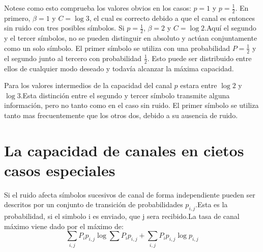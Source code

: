 Notese como esto comprueba los valores obvios en los casos: $p = 1$ y $p = \frac{1}{2}$. En primero, $\beta = 1$ y $C = \log{3}$, 
el cual es correcto debido a que el canal es entonces sin ruido con tres posibles s\'imbolos. Si $p = \frac{1}{2}$, $\beta = 2$ y 
$C = \log{2}$.Aqu\'i el segundo y el tercer s\'imbolos, no se pueden distinguir en absoluto y act\'uan conjuntamente como un solo 
s\'imbolo. El primer s\'imbolo se utiliza con una probabilidad $P = \frac{1}{2}$  y el segundo junto al tercero con probabilidad $\frac{1}{2}$.
Esto puede ser distribuido entre ellos de cualquier modo deseado y todav\'ia alcanzar la m\'axima capacidad.

Para los valores intermedios de la capacidad del canal $p$ estara entre $\log{2}$ y $\log{3}$.Esta distinci\'on 
entre el segundo y tercer s\'imbolo transmite alguna informaci\'on, pero no tanto como en el caso sin ruido.
El primer s\'imbolo se utiliza tanto mas frecuentemente que los otros dos, debido a su ausencia de ruido.

\clearpage

\chapter{La capacidad de canales en cietos casos especiales}
\label{sec:16}

Si el ruido afecta s\'imbolos sucesivos de canal de forma
independiente pueden ser descritos por un conjunto de transici\'on de
probabilidades $p_{i,j}$.Esta es la probabilidad, si el simbolo i es
enviado, que j sera recibido.La tasa de canal m\'aximo viene dado por
el m\'aximo de:
\begin{equation}
  \sum_{i,j}P_i p_{i,j} \log{\sum{P_i p_{i,j}}} + \sum_{i,j}P_i p_{i,j}\log{p_{i,j}}
\end{equation}
 
